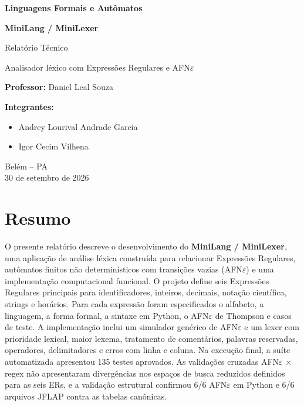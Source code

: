 \documentclass[12pt,a4paper,oneside]{report}
\newcommand{\NomeProjeto}{MiniLang / MiniLexer}
\newcommand{\Disciplina}{Linguagens Formais e Autômatos}
\newcommand{\Professor}{Daniel Leal Souza}
\newcommand{\DataEntrega}{30 de setembro de 2026}
\begin{document}
\begin{titlepage}
\centering
\vspace*{1.5cm}
{\Large \textbf{\Disciplina}\par}
\vspace{2cm}
{\Huge \textbf{\NomeProjeto}\par}
\vspace{0.6cm}
{\Large Relatório Técnico\par}
\vspace{1.5cm}
{\large Analisador léxico com Expressões Regulares e AFN$\varepsilon$\par}
\vfill
\begin{flushleft}
\textbf{Professor:} \Professor
\par\medskip
\textbf{Integrantes:}
\begin{itemize}[leftmargin=1.2cm]
\item Andrey Lourival Andrade Garcia
\item Igor Cecim Vilhena
\end{itemize}
\end{flushleft}
\vfill
{\large Belém -- PA\\\DataEntrega\par}
\end{titlepage}

\chapter*{Resumo}
O presente relatório descreve o desenvolvimento do \textbf{MiniLang / MiniLexer}, uma aplicação de análise léxica construída para relacionar Expressões Regulares, autômatos finitos não determinísticos com transições vazias (AFN$\varepsilon$) e uma implementação computacional funcional. O projeto define seis Expressões Regulares principais para identificadores, inteiros, decimais, notação científica, strings e horários. Para cada expressão foram especificados o alfabeto, a linguagem, a forma formal, a sintaxe em Python, o AFN$\varepsilon$ de Thompson e casos de teste. A implementação inclui um simulador genérico de AFN$\varepsilon$ e um lexer com prioridade lexical, maior lexema, tratamento de comentários, palavras reservadas, operadores, delimitadores e erros com linha e coluna. Na execução final, a suíte automatizada apresentou 135 testes aprovados. As validações cruzadas AFN$\varepsilon$ $\times$ regex não apresentaram divergências nos espaços de busca reduzidos definidos para as seis ERs, e a validação estrutural confirmou 6/6 AFN$\varepsilon$ em Python e 6/6 arquivos JFLAP contra as tabelas canônicas.
\end{document}
